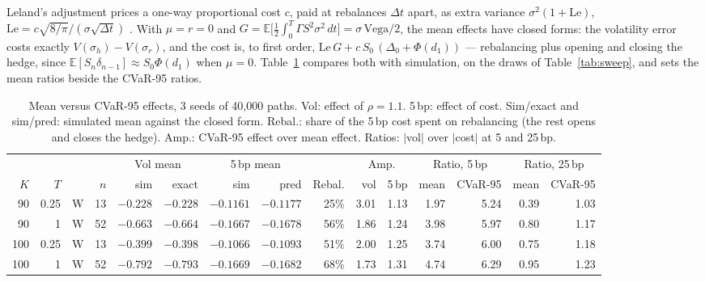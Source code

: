 \documentclass{article}
\newcommand{\cvar}{CVaR-95}
\newcommand{\bps}{\,bp}
\begin{document}
Leland's adjustment prices a one-way proportional cost $c$, paid at rebalances $\Delta t$ apart,
as extra variance $\sigma^2(1 + \mathrm{Le})$, $\mathrm{Le} = c\sqrt{8/\pi}/(\sigma\sqrt{\Delta
t})$ \citep{leland1985option}. With $\mu = r = 0$ and
$G = \mathbb{E}\big[\tfrac12\int_0^T \Gamma S^2 \sigma^2\, dt\big] = \sigma\,\mathrm{Vega}/2$, the
mean effects have closed forms: the volatility error costs exactly $V(\sigma_h) - V(\sigma_r)$, and
the cost is, to first order, $\mathrm{Le}\,G + c\,S_0\,(\Delta_0 + \Phi(d_1))$ --- rebalancing plus
opening and closing the hedge, since $\mathbb{E}[S_n \delta_{n-1}] \approx S_0 \Phi(d_1)$ when
$\mu = 0$. Table~\ref{tab:mechanism-full} compares both with simulation, on the draws of
Table~\ref{tab:sweep}, and sets the mean ratios beside the \cvar{} ratios.

\begin{table}[h]
  \caption{Mean versus \cvar{} effects, 3 seeds of 40{,}000 paths. Vol: effect of $\rho = 1.1$.
    5\bps{}: effect of cost. Sim/exact and sim/pred: simulated mean against the closed form.
    Rebal.: share of the 5\bps{} cost spent on rebalancing (the rest opens and closes the hedge).
    Amp.: \cvar{} effect over mean effect. Ratios: $|$vol$|$ over $|$cost$|$ at 5 and 25\bps{}.}
  \label{tab:mechanism-full}
  \centering
  \scriptsize
  \setlength{\tabcolsep}{2.6pt}
  \begin{tabular}{rrcr rr rr r rr rr rr}
    \toprule
     & & & & \multicolumn{2}{c}{Vol mean} & \multicolumn{2}{c}{5\bps{} mean} & & \multicolumn{2}{c}{Amp.} & \multicolumn{2}{c}{Ratio, 5\bps{}} & \multicolumn{2}{c}{Ratio, 25\bps{}} \\
    \cmidrule(lr){5-6}\cmidrule(lr){7-8}\cmidrule(lr){10-11}\cmidrule(lr){12-13}\cmidrule(lr){14-15}
    $K$ & $T$ & & $n$ & sim & exact & sim & pred & Rebal. & vol & 5\bps{} & mean & \cvar{} & mean & \cvar{} \\
    \midrule
    90 & 0.25 & W & 13 & $-0.228$ & $-0.228$ & $-0.1161$ & $-0.1177$ & 25\% & 3.01 & 1.13 & 1.97 & 5.24 & 0.39 & 1.03 \\
    90 & 1 & W & 52 & $-0.663$ & $-0.664$ & $-0.1667$ & $-0.1678$ & 56\% & 1.86 & 1.24 & 3.98 & 5.97 & 0.80 & 1.17 \\
    100 & 0.25 & W & 13 & $-0.399$ & $-0.398$ & $-0.1066$ & $-0.1093$ & 51\% & 2.00 & 1.25 & 3.74 & 6.00 & 0.75 & 1.18 \\
    100 & 1 & W & 52 & $-0.792$ & $-0.793$ & $-0.1669$ & $-0.1682$ & 68\% & 1.73 & 1.31 & 4.74 & 6.29 & 0.95 & 1.23 \\

\end{tabular}
\end{table}
\end{document}

